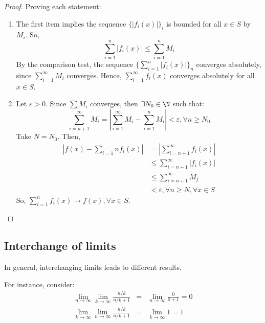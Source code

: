 \begin{proof}
    Proving each statement:
    \begin{enumerate}
        \item The first item implies the sequence $\{|f_i(x)|\}_i$ is bounded for all $x \in S$ by $M_i$. So,
            \begin{equation*}
                \sum \limits_{i=1}^n |f_i(x)| \leq \sum \limits_{i=1}^n M_i
            \end{equation*}
        By the comparison test, the sequence $\{\sum_{i=1}^n |f_i(x)|\}_n$ converges absolutely, since $\sum_{i=1}^\infty M_i$ converges. Hence, $\sum_{i=1}^\infty f_i(x)$ converges absolutely for all $ x \in S$.
        \item Let $\varepsilon > 0$. Since $\sum M_i$ converges, then $\exists N_0 \in \N$ such that:
            \begin{equation*}
                \sum \limits_{i = n+1}^\infty M_i = \left |
                    \sum \limits_{i = 1}^\infty M_i
                    - \sum \limits_{i = 1}^n M_i
                \right | < \varepsilon, \forall n \geq N_0
            \end{equation*}
            Take $N = N_0$. Then,
            \begin{align*}
                \left |
                    f(x) - \sum \limits_{i = 1}n f_i(x)
                \right |
                &= \left |
                    \sum \limits_{i = n+1}^\infty f_i(x)
                \right | \\
                &\leq \sum \limits_{i = n+1}^\infty |f_i(x)| \\
                &\leq \sum \limits_{i = n+1}^\infty M_j \\
                &< \varepsilon, \forall n \geq N, \forall x \in S
            \end{align*}
            So, $\sum_{i=1}^n f_i(x) \to f(x), \forall x \in S$.
    \end{enumerate}
\end{proof}

\subsection{Interchange of limits}


\begin{remark}
    In general, interchanging limits leads to different results.    
\end{remark}


\begin{eg}
    For instance, consider:
    \begin{eqnarray*}
        \lim \limits_{n \to \infty} \lim \limits_{k \to \infty} \frac{n/k}{n/k + 1} &=& \lim \limits_{n \to \infty} \frac{0}{0+1} = 0 \\
        \lim \limits_{k \to \infty} \lim \limits_{n \to \infty} \frac{n/k}{n/k + 1} &=& \lim \limits_{k \to \infty} 1 = 1
    \end{eqnarray*}
\end{eg}

